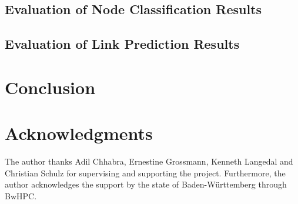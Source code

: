 \documentclass[acmsmall,nonacm,screen,review]{acmart}
\begin{document}
\subsection{Evaluation of Node Classification Results}
\subsection{Evaluation of Link Prediction Results}
\section{Conclusion}
\section{Acknowledgments}
The author thanks Adil Chhabra, Ernestine Grossmann, Kenneth Langedal and Christian Schulz for supervising and supporting the project. Furthermore, the author acknowledges the support by the state of Baden-Württemberg through BwHPC.


\end{document}

